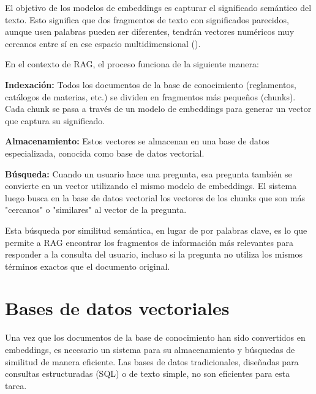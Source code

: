 {{El objetivo de los modelos de embeddings es capturar el significado semántico del texto. Esto significa que dos fragmentos de texto con significados parecidos, aunque usen palabras pueden ser diferentes, tendrán vectores numéricos muy cercanos entre sí en ese espacio multidimensional (\cite{mikolov2013efficient}). 

En el contexto de RAG, el proceso funciona de la siguiente manera:

\begin{listaenumerada}
\item \textbf{Indexación:} Todos los documentos de la base de conocimiento (reglamentos, catálogos de materias, etc.) se dividen en fragmentos más pequeños (chunks). Cada chunk se pasa a través de un modelo de embeddings para generar un vector que captura su significado.
\item \textbf{Almacenamiento:} Estos vectores se almacenan en una base de datos especializada, conocida como base de datos vectorial.
\item \textbf{Búsqueda:} Cuando un usuario hace una pregunta, esa pregunta también se convierte en un vector utilizando el mismo modelo de embeddings. El sistema luego busca en la base de datos vectorial los vectores de los chunks que son más "cercanos" o "similares" al vector de la pregunta.
\end{listaenumerada}

Esta búsqueda por similitud semántica, en lugar de por palabras clave, es lo que permite a RAG encontrar los fragmentos de información más relevantes para responder a la consulta del usuario, incluso si la pregunta no utiliza los mismos términos exactos que el documento original.

\section{Bases de datos vectoriales}
Una vez que los documentos de la base de conocimiento han sido convertidos en embeddings, es necesario un sistema para su almacenamiento y búsquedas de similitud de manera eficiente. Las bases de datos tradicionales, diseñadas para consultas estructuradas (SQL) o de texto simple, no son eficientes para esta tarea. 

}}
